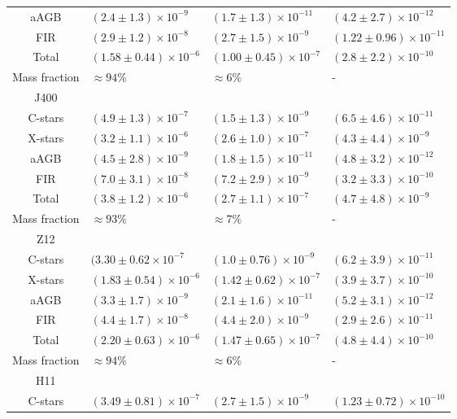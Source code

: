 \documentclass[useAMS,usenatbib]{mn2e/mn2e}
\begin{document}
{\begin{table*}
\begin{center}
\begin{tabular}{c l l l}
aAGB  & $(2.4\pm1.3)\times10^{-9}$  &     $(1.7\pm1.3)\times10^{-11}$  &     $(4.2\pm2.7)\times10^{-12}$  \\  
FIR  & $(2.9\pm1.2)\times10^{-8}$  &     $(2.7\pm1.5)\times10^{-9}$  &     $(1.22\pm0.96)\times10^{-11}$  \\  
Total  & $(1.58\pm0.44)\times10^{-6}$  &     $(1.00\pm 0.45) \times10^{-7}$& $(2.8\pm   2.2)\times10^{-10}$\\
Mass fraction   &   $\approx94\%$  &       $\approx6\%$  &     -\\
\hline
J400& & & \\
\hline
C-stars &  $(4.9\pm1.3)\times10^{-7}$  &     $(1.5\pm1.3)\times10^{-9}$  &  $(6.5\pm4.6)\times10^{-11}$  \\  
X-stars &  $(3.2\pm1.1)\times10^{-6}$  &     $(2.6\pm1.0)\times10^{-7}$  &     $(4.3\pm  4.4)\times10^{-9}$  \\  
aAGB  & $(4.5\pm2.8)\times10^{-9}$  &     $(1.8\pm1.5)\times10^{-11}$  &     $(4.8\pm   3.2)\times10^{-12}$  \\  
FIR &  $(7.0\pm3.1)\times10^{-8}$  & $(7.2\pm2.9)\times10^{-9}$  &  $(3.2\pm 3.3)\times10^{-10}$  \\ Total  & $(3.8\pm1.2)\times10^{-6}$  &     $(2.7\pm1.1)\times10^{-7}$  &     $(4.7\pm4.8)\times10^{-9}$\\
Mass fraction   &   $\approx93\%$  &      $\approx7\%$  &      -\\
\hline
Z12& & & \\
\hline
C-stars  & $(3.30\pm0.62\times10^{-7}$  &   $(1.0\pm0.76)\times10^{-9}$  &  $(6.2\pm3.9)\times10^{-11}$\\  
X-stars &  $(1.83\pm0.54)\times10^{-6}$  &  $(1.42\pm0.62)\times10^{-7}$  & $(3.9\pm3.7)\times10^{-10}$  \\  
aAGB &  $(3.3\pm1.7)\times10^{-9}$  &  $(2.1\pm1.6)\times10^{-11}$  &  $(5.2\pm3.1)\times10^{-12}$  \\  
FIR &  $(4.4\pm1.7)\times10^{-8}$  &     $(4.4\pm2.0)\times10^{-9}$  &     $(2.9\pm2.6)\times10^{-11}$  \\  
Total &  $(2.20\pm0.63)\times10^{-6}$  &     $(1.47\pm0.65)\times10^{-7}$  & $(4.8\pm4.4)\times10^{-10}$\\
Mass fraction  &    $\approx94\%$  &      $\approx6\%$  &     -\\
\hline
H11& & & \\
\hline
C-stars &  $(3.49\pm0.81)\times10^{-7}$  &  $(2.7\pm1.5)\times10^{-9}$ & $(1.23\pm   0.72)\times10^{-10}$  \\  

\end{tabular}
\end{center}
\end{table*}}
\end{document}
